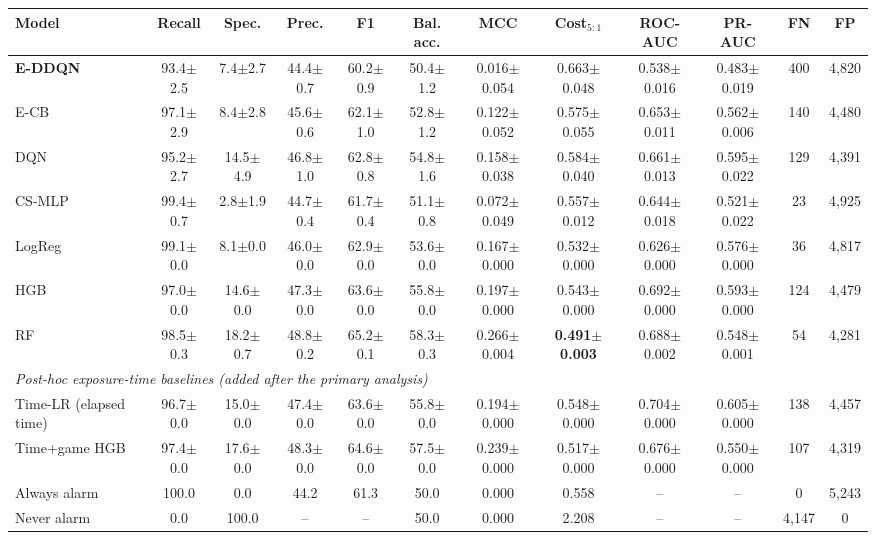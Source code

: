 \begin{tabular}{lccccccccccc}
\toprule
Model & Recall & Spec. & Prec. & F1 & Bal. acc. & MCC & Cost$_{5:1}$ & ROC-AUC & PR-AUC & FN & FP \\
\midrule
\textbf{E-DDQN} & 93.4$\pm$2.5 & 7.4$\pm$2.7 & 44.4$\pm$0.7 & 60.2$\pm$0.9 & 50.4$\pm$1.2 & 0.016$\pm$0.054 & 0.663$\pm$0.048 & 0.538$\pm$0.016 & 0.483$\pm$0.019 & 400 & 4,820 \\
E-CB & 97.1$\pm$2.9 & 8.4$\pm$2.8 & 45.6$\pm$0.6 & 62.1$\pm$1.0 & 52.8$\pm$1.2 & 0.122$\pm$0.052 & 0.575$\pm$0.055 & 0.653$\pm$0.011 & 0.562$\pm$0.006 & 140 & 4,480 \\
DQN & 95.2$\pm$2.7 & 14.5$\pm$4.9 & 46.8$\pm$1.0 & 62.8$\pm$0.8 & 54.8$\pm$1.6 & 0.158$\pm$0.038 & 0.584$\pm$0.040 & 0.661$\pm$0.013 & 0.595$\pm$0.022 & 129 & 4,391 \\
CS-MLP & 99.4$\pm$0.7 & 2.8$\pm$1.9 & 44.7$\pm$0.4 & 61.7$\pm$0.4 & 51.1$\pm$0.8 & 0.072$\pm$0.049 & 0.557$\pm$0.012 & 0.644$\pm$0.018 & 0.521$\pm$0.022 & 23 & 4,925 \\
LogReg & 99.1$\pm$0.0 & 8.1$\pm$0.0 & 46.0$\pm$0.0 & 62.9$\pm$0.0 & 53.6$\pm$0.0 & 0.167$\pm$0.000 & 0.532$\pm$0.000 & 0.626$\pm$0.000 & 0.576$\pm$0.000 & 36 & 4,817 \\
HGB & 97.0$\pm$0.0 & 14.6$\pm$0.0 & 47.3$\pm$0.0 & 63.6$\pm$0.0 & 55.8$\pm$0.0 & 0.197$\pm$0.000 & 0.543$\pm$0.000 & 0.692$\pm$0.000 & 0.593$\pm$0.000 & 124 & 4,479 \\
RF & 98.5$\pm$0.3 & 18.2$\pm$0.7 & 48.8$\pm$0.2 & 65.2$\pm$0.1 & 58.3$\pm$0.3 & 0.266$\pm$0.004 & \textbf{0.491$\pm$0.003} & 0.688$\pm$0.002 & 0.548$\pm$0.001 & 54 & 4,281 \\
\midrule
\multicolumn{12}{l}{\emph{Post-hoc exposure-time baselines (added after the primary analysis)}} \\
Time-LR (elapsed time) & 96.7$\pm$0.0 & 15.0$\pm$0.0 & 47.4$\pm$0.0 & 63.6$\pm$0.0 & 55.8$\pm$0.0 & 0.194$\pm$0.000 & 0.548$\pm$0.000 & 0.704$\pm$0.000 & 0.605$\pm$0.000 & 138 & 4,457 \\
Time+game HGB & 97.4$\pm$0.0 & 17.6$\pm$0.0 & 48.3$\pm$0.0 & 64.6$\pm$0.0 & 57.5$\pm$0.0 & 0.239$\pm$0.000 & 0.517$\pm$0.000 & 0.676$\pm$0.000 & 0.550$\pm$0.000 & 107 & 4,319 \\
\midrule
Always alarm & 100.0 & 0.0 & 44.2 & 61.3 & 50.0 & 0.000 & 0.558 & -- & -- & 0 & 5,243 \\
Never alarm & 0.0 & 100.0 & -- & -- & 50.0 & 0.000 & 2.208 & -- & -- & 4,147 & 0 \\
\bottomrule
\end{tabular}
